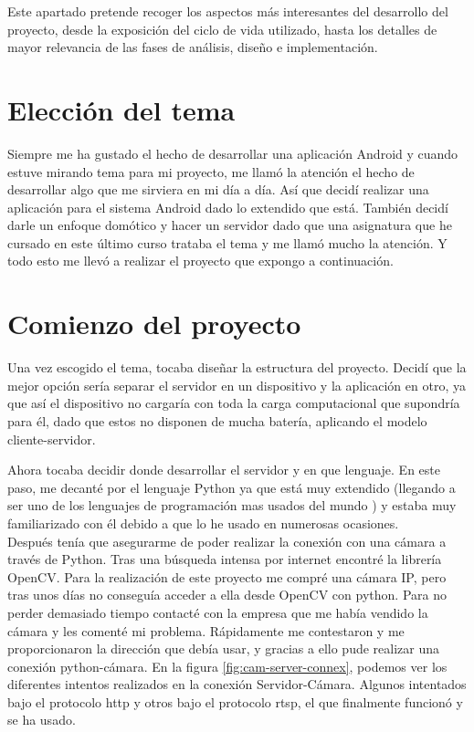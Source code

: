 
Este apartado pretende recoger los aspectos más interesantes del desarrollo del proyecto, desde la exposición del ciclo de vida utilizado, hasta los detalles de mayor relevancia de las fases de análisis, diseño e implementación.

\section{Elección del tema}

Siempre me ha gustado el hecho de desarrollar una aplicación Android y cuando estuve mirando tema para mi proyecto, me llamó la atención el hecho de desarrollar algo que me sirviera en mi día a día. 
Así que decidí realizar una aplicación para el sistema Android dado lo extendido que está. 
También decidí darle un enfoque domótico y hacer un servidor dado que una asignatura que he cursado en este último curso trataba el tema y me llamó mucho la atención. 
Y todo esto me llevó a realizar el proyecto que expongo a continuación.



\section{Comienzo del proyecto}

Una vez escogido el tema, tocaba diseñar la estructura del proyecto. 
Decidí que la mejor opción sería separar el servidor en un dispositivo y la aplicación en otro, ya que así el dispositivo no cargaría con toda la carga computacional que supondría para él, dado que estos no disponen de mucha batería, aplicando el modelo cliente-servidor.


Ahora tocaba decidir donde desarrollar el servidor y en que lenguaje. En este paso, me decanté por el lenguaje Python ya que está muy extendido (llegando a ser uno de los lenguajes de programación mas usados del mundo \cite{pythonuse}) y estaba muy familiarizado con él debido a que lo he usado en numerosas ocasiones.\\
Después tenía que asegurarme de poder realizar la conexión con una cámara a través de Python.
Tras una búsqueda intensa por internet encontré la librería OpenCV. 
Para la realización de este proyecto me compré una cámara IP, pero tras unos días no conseguía acceder a ella desde OpenCV con python. 
Para no perder demasiado tiempo contacté con la empresa que me había vendido la cámara y les comenté mi problema.
Rápidamente me contestaron y me proporcionaron la dirección que debía usar, y gracias a ello pude realizar una conexión python-cámara.
En la figura \ref{fig:cam-server-connex}, podemos ver los diferentes intentos realizados en la conexión Servidor-Cámara. Algunos intentados bajo el protocolo http y otros bajo el protocolo rtsp, el que finalmente funcionó y se ha usado.

